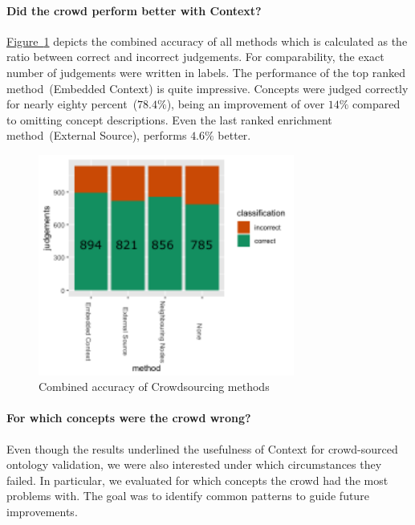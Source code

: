 \paragraph{Did the crowd perform better with Context?}
\hyperref[fig:results_accuracy_combined]{Figure~\ref*{fig:results_accuracy_combined}} depicts the combined accuracy of all methods which is calculated
as the ratio between correct and incorrect judgements. For comparability, the exact number of judgements were written in labels. The performance of the top ranked method~(Embedded Context) is quite impressive. Concepts were judged correctly for nearly eighty percent~($78.4\%$), being an improvement of over $14\%$ compared to omitting concept descriptions. Even the last ranked enrichment method~(External Source), performs $4.6\%$ better.
\begin{figure}
	 \centering
	 \includegraphics[width=0.75\textwidth]{plots/comparison/barplot_all_judgements}
	 \caption{Combined accuracy of Crowdsourcing methods}\label{fig:results_accuracy_combined}
\end{figure}

\paragraph{For which concepts were the crowd wrong?}
Even though the results underlined the usefulness of Context for crowd-sourced ontology validation, we were also interested under which circumstances they failed. In particular, we evaluated for which concepts the crowd had the most problems with. The goal was to identify common patterns to guide future improvements. 

